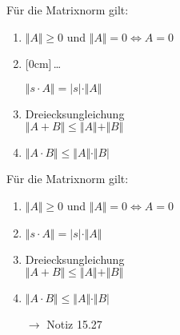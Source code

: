 \documentclass[11pt]{article}
\renewcommand{\cite}[1]{\par\bigskip\hfill{\color{gray}\tiny\(\to\) #1}}
\renewcommand{\leq}{\leqslant}
\renewcommand{\geq}{\geqslant}
\newcommand{\hide}[1]{\parbox{0cm}{\raisebox{-7pt}[0cm]{\dots}}\color{white}#1\color{black}}
\let\olddots\dots
\renewcommand{\dots}{\,\olddots\,}
\newenvironment{field}{}{\newpage}
\newif\ifnote
\newenvironment{note}{\notetrue}{\notefalse}
\begin{document}
\begin{note}
    \begin{field}
        Für die Matrixnorm gilt:
        \begin{enumerate}[(1)]
            \item $\Vert A \Vert \geq 0$ und $\Vert A \Vert = 0 \Leftrightarrow A = 0$
            \item \hide{$\Vert s\cdot A\Vert = \vert s \vert\cdot\Vert A \Vert$}
            \item Dreiecksungleichung\\
            $\Vert A+B\Vert \leq \Vert A\Vert+\Vert B \Vert$
            \item $\Vert A\cdot B\Vert \leq \Vert A\Vert\cdot\Vert B \vert$
        \end{enumerate}
    \end{field}
    \begin{field}
        Für die Matrixnorm gilt:
        \begin{enumerate}[(1)]
            \item $\Vert A \Vert \geq 0$ und $\Vert A \Vert = 0 \Leftrightarrow A = 0$
            \item $\Vert s\cdot A\Vert = \vert s \vert\cdot\Vert A \Vert$
            \item Dreiecksungleichung\\
            $\Vert A+B\Vert \leq \Vert A\Vert+\Vert B \Vert$
            \item $\Vert A\cdot B\Vert \leq \Vert A\Vert\cdot\Vert B \vert$
            \cite{Notiz 15.27}
        \end{enumerate}
    \end{field}


\end{note}
\end{document}
